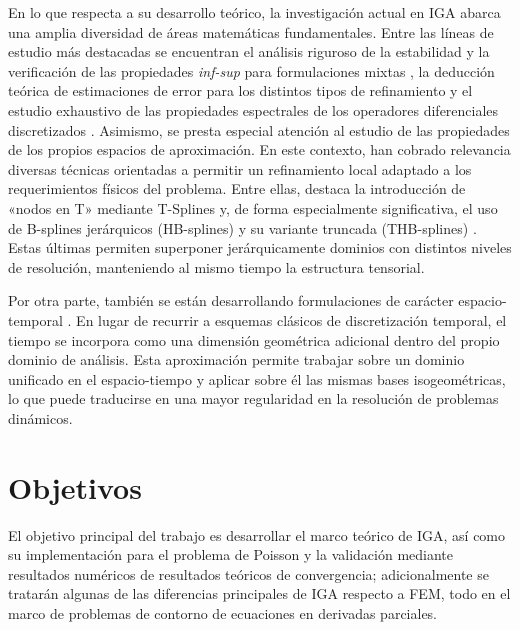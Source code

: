 \documentclass[11pt]{book}
\theoremstyle{plain} %
\theoremstyle{definition} %
\theoremstyle{definition} %
\begin{document}

En lo que respecta a su desarrollo teórico, la investigación actual en IGA abarca una amplia diversidad de áreas matemáticas fundamentales.
Entre las líneas de estudio más destacadas se encuentran el análisis riguroso de la estabilidad y la verificación de las propiedades \textit{inf-sup}
para formulaciones mixtas \cite{buffa_isogeometric_2011}, la deducción teórica de estimaciones de error para los distintos tipos de refinamiento
\cite{veiga_estimates_2009} y el estudio exhaustivo de las propiedades espectrales de los operadores diferenciales discretizados \cite{cottrell_isogeometric_2006}.
Asimismo, se presta especial atención al estudio de las propiedades de los propios espacios de aproximación. En este contexto, han cobrado relevancia diversas técnicas
orientadas a permitir un refinamiento local adaptado a los requerimientos físicos del problema. Entre ellas, destaca la introducción de «nodos en T» mediante T-Splines
\cite{bazilevs_isogeometric_2010} y, de forma especialmente significativa, el uso de B-splines jerárquicos (HB-splines) y su variante truncada (THB-splines) \cite{a_hierarchical_2011, giannelli_thb-splines_2012}.
Estas últimas permiten superponer jerárquicamente dominios con distintos niveles de resolución, manteniendo al mismo tiempo la estructura tensorial.

Por otra parte, también se están desarrollando formulaciones de carácter espacio-temporal \cite{langer_space-time_2016}. 
En lugar de recurrir a esquemas clásicos de discretización temporal, el tiempo se incorpora 
como una dimensión geométrica adicional dentro del propio dominio de análisis. 
Esta aproximación permite trabajar sobre un dominio unificado en el espacio-tiempo y aplicar 
sobre él las mismas bases isogeométricas, lo que puede traducirse en una mayor regularidad 
en la resolución de problemas dinámicos.

\section{Objetivos}

\vspace{-0.1cm}


El objetivo principal del trabajo es desarrollar el marco teórico de IGA, 
así como su implementación para el problema de Poisson y la validación mediante resultados numéricos de resultados teóricos de convergencia; adicionalmente se tratarán algunas de las diferencias principales de IGA 
respecto a FEM, todo en el marco de problemas de contorno de ecuaciones en derivadas parciales.
\end{document}
